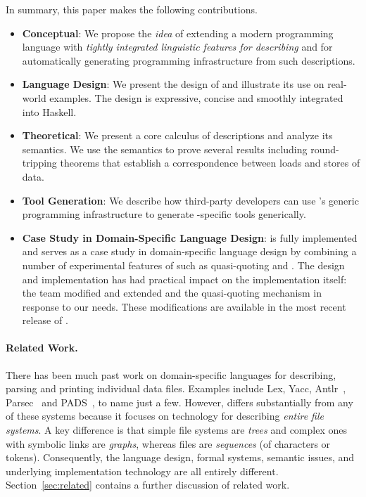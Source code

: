 In summary, this paper makes the following contributions.
\begin{itemize}
\item {\bf Conceptual}:  We propose the {\em idea} 
of extending a modern programming language with
{\em tightly integrated linguistic features for describing \filestores{}}
and for automatically generating programming infrastructure from such 
descriptions.

\item {\bf Language Design}: We present the design of \forest{}
  and illustrate its use on real-world examples.
  The design is expressive, concise and smoothly integrated into
  Haskell.  

\item {\bf Theoretical}: We present a core calculus of \forest{}
descriptions and analyze its semantics.  We use the semantics
to prove several results including round-tripping theorems that
establish a correspondence between loads and stores of \filestore{} data.

\item {\bf Tool Generation}: We describe how third-party developers
  can use \haskell{}'s generic programming infrastructure to generate
  \filestore{}-specific tools generically.

\item {\bf Case Study in Domain-Specific Language Design}: \forest{}
  is fully implemented and serves
  as a case study in domain-specific
  language design by combining a number of
  experimental features of \haskell{} such as quasi-quoting and \template{}.
  The \forest{} design and implementation 
  has had practical impact on the \haskell{} implementation itself:  
  the \haskell{} team modified and extended \template{} and the
  quasi-quoting mechanism in response
  to our needs.  These modifications
  are available in the most recent release of \haskell{}.
\end{itemize}

\paragraph*{Related Work.}
There has been much past work on domain-specific languages for
describing, parsing and printing individual data files. 
Examples include 
Lex, Yacc,
Antlr~\cite{antlr}, Parsec~\cite{LeijenMeijer:parsec} and 
PADS~\cite{fisher+:toplas}, to name just a few.  
However, \forest{} differs
substantially from any of these systems because it focuses on technology
for describing {\em entire file systems}.  
A key difference is that
simple file systems are {\em trees} and complex ones with symbolic links are 
{\em graphs}, whereas files are {\em sequences} (of characters
or tokens). Consequently,
the language design, formal systems,
semantic issues, and underlying implementation 
technology are all entirely different.  Section~\ref{sec:related}
contains a further discussion of related work.

